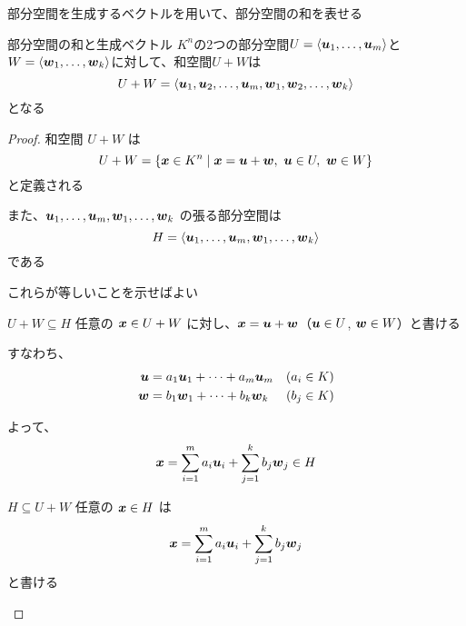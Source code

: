 \documentclass[../../../topic_linear-algebra]{subfiles}
\begin{document}
\sectionline

部分空間を生成するベクトルを用いて、部分空間の和を表せる

\begin{theorem}{部分空間の和と生成ベクトル}\label{thm:sum-of-subspaces-span}
  $K^n$の2つの部分空間$U = \langle \vb*{u}_1, \dots, \vb*{u}_m \rangle$と
  $W = \langle \vb*{w}_1, \dots, \vb*{w}_k \rangle$に対して、和空間$U + W$は
  \begin{equation*}
    U + W = \langle \vb*{u}_1, \vb*{u}_2, \dots, \vb*{u}_m, \vb*{w}_1, \vb*{w}_2, \dots, \vb*{w}_k \rangle
  \end{equation*}
  となる
\end{theorem}

\begin{proof}
  和空間 $U + W$ は
  \begin{equation*}
    U + W = \{ \vb*{x} \in K^n \mid \vb*{x} = \vb*{u} + \vb*{w},\ \vb*{u} \in U,\ \vb*{w} \in W \}
  \end{equation*}
  と定義される

  また、$\vb*{u}_1, \dots, \vb*{u}_m, \vb*{w}_1, \dots, \vb*{w}_k$ の張る部分空間は
  \begin{equation*}
    H = \langle \vb*{u}_1, \dots, \vb*{u}_m, \vb*{w}_1, \dots, \vb*{w}_k \rangle
  \end{equation*}
  である

  これらが等しいことを示せばよい

  \begin{subpattern}{$U+W \subseteq H$}
    任意の $\vb*{x} \in U + W$ に対し、$\vb*{x} = \vb*{u} + \vb*{w}$（$\vb*{u} \in U$, $\vb*{w} \in W$）と書ける

    すなわち、
    \begin{align*}
      \vb*{u} & = a_1 \vb*{u}_1 + \dots + a_m \vb*{u}_m & (a_i \in K) \\
      \vb*{w} & = b_1 \vb*{w}_1 + \dots + b_k \vb*{w}_k & (b_j \in K)
    \end{align*}

    よって、
    \begin{equation*}
      \vb*{x} = \sum_{i=1}^m a_i \vb*{u}_i + \sum_{j=1}^k b_j \vb*{w}_j \in H
    \end{equation*}
  \end{subpattern}

  \begin{subpattern}{$H \subseteq U + W$}
    任意の $\vb*{x} \in H$ は
    \begin{equation*}
      \vb*{x} = \sum_{i=1}^m a_i \vb*{u}_i + \sum_{j=1}^k b_j \vb*{w}_j
    \end{equation*}
    と書ける


\end{subpattern}
\end{proof}
\end{document}
